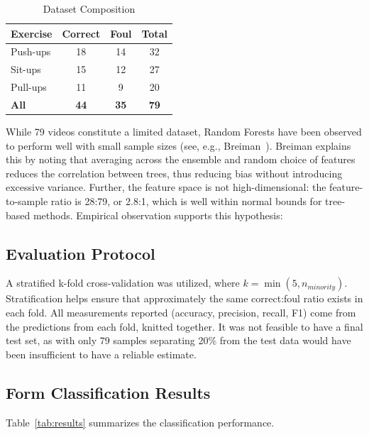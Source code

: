 \documentclass[conference]{IEEEtran}
\begin{document}
\begin{table}[ht]
\caption{Dataset Composition}
\label{tab:dataset}
\centering
\begin{tabular}{@{}lccc@{}}
\toprule
\textbf{Exercise} & \textbf{Correct} & \textbf{Foul} & \textbf{Total} \\
\midrule
Push-ups & 18 & 14 & 32 \\
Sit-ups  & 15 & 12 & 27 \\
Pull-ups & 11 &  9 & 20 \\
\midrule
\textbf{All} & \textbf{44} & \textbf{35} & \textbf{79} \\
\bottomrule
\end{tabular}
\end{table}

While 79 videos constitute a limited dataset, Random Forests have been observed to perform well with small sample sizes (see, e.g., Breiman~\cite{breiman2001}). Breiman explains this by noting that averaging across the ensemble and random choice of features reduces the correlation between trees, thus reducing bias without introducing excessive variance. Further, the feature space is not high-dimensional: the feature-to-sample ratio is 28:79, or 2.8:1, which is well within normal bounds for tree-based methods. Empirical observation supports this hypothesis:

\subsection{Evaluation Protocol}
A stratified k-fold cross-validation was utilized, where $k=\min(5,n_{minority})$. Stratification helps ensure that approximately the same correct:foul ratio exists in each fold. All measurements reported (accuracy, precision, recall, F1) come from the predictions from each fold, knitted together. It was not feasible to have a final test set, as with only 79 samples separating 20\% from the test data would have been insufficient to have a reliable estimate.

\subsection{Form Classification Results}
\label{sec:results}

Table~\ref{tab:results} summarizes the classification performance.
\end{document}
